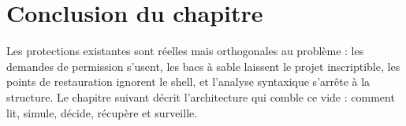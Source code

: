 \section*{Conclusion du chapitre}
Les protections existantes sont réelles mais orthogonales au problème : les demandes de
permission s'usent, les bacs à sable laissent le projet inscriptible, les points de
restauration ignorent le shell, et l'analyse syntaxique s'arrête à la structure. Le
chapitre suivant décrit l'architecture qui comble ce vide : comment \demo{} lit, simule,
décide, récupère et surveille.
